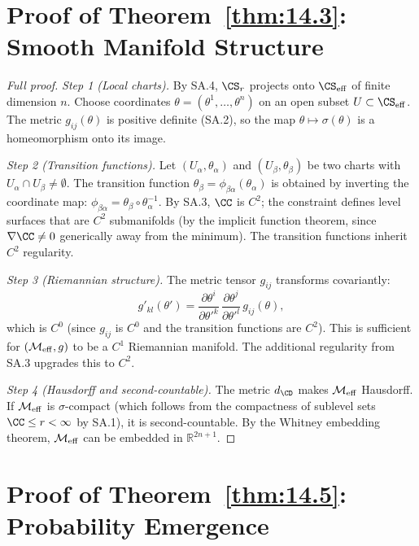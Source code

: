 \section{Proof of Theorem~\ref{thm:14.3}: Smooth Manifold Structure}
\label{app:pf-manifold}

\begin{proof}[Full proof]
\emph{Step 1 (Local charts).}
By SA.4, $\CS_r$ projects onto $\CS_{\mathrm{eff}}$ of finite
dimension $n$.  Choose coordinates
$\theta = (\theta^1, \ldots, \theta^n)$ on an open subset
$U \subset \CS_{\mathrm{eff}}$.  The metric
$g_{ij}(\theta)$ is positive definite (SA.2), so the map
$\theta \mapsto \sigma(\theta)$ is a homeomorphism onto its image.

\emph{Step 2 (Transition functions).}
Let $(U_\alpha, \theta_\alpha)$ and $(U_\beta, \theta_\beta)$
be two charts with $U_\alpha \cap U_\beta \neq \emptyset$.
The transition function
$\theta_\beta = \phi_{\beta\alpha}(\theta_\alpha)$ is obtained
by inverting the coordinate map:
$\phi_{\beta\alpha} = \theta_\beta \circ \theta_\alpha^{-1}$.
By SA.3, $\CC$ is $C^2$; the constraint defines level surfaces
that are $C^2$ submanifolds (by the implicit function theorem,
since $\nabla\CC \neq 0$ generically away from the minimum).
The transition functions inherit $C^2$ regularity.

\emph{Step 3 (Riemannian structure).}
The metric tensor $g_{ij}$ transforms covariantly:
\[
  g'_{kl}(\theta') = \frac{\partial\theta^i}{\partial\theta'^k}\,
  \frac{\partial\theta^j}{\partial\theta'^l}\,g_{ij}(\theta),
\]
which is $C^0$ (since $g_{ij}$ is $C^0$ and the transition
functions are $C^2$).  This is sufficient for
$(\mathcal{M}_{\mathrm{eff}}, g)$ to be a $C^1$ Riemannian manifold.
The additional regularity from SA.3 upgrades this to $C^2$.

\emph{Step 4 (Hausdorff and second-countable).}
The metric $d_{\CD}$ makes $\mathcal{M}_{\mathrm{eff}}$ Hausdorff.
If $\mathcal{M}_{\mathrm{eff}}$ is $\sigma$-compact (which follows from
the compactness of sublevel sets $\CC \leq r < \infty$ by SA.1),
it is second-countable.  By the Whitney embedding theorem,
$\mathcal{M}_{\mathrm{eff}}$ can be embedded in $\mathbb{R}^{2n+1}$.
\end{proof}

\section{Proof of Theorem~\ref{thm:14.5}: Probability Emergence}
\label{app:pf-probability}

